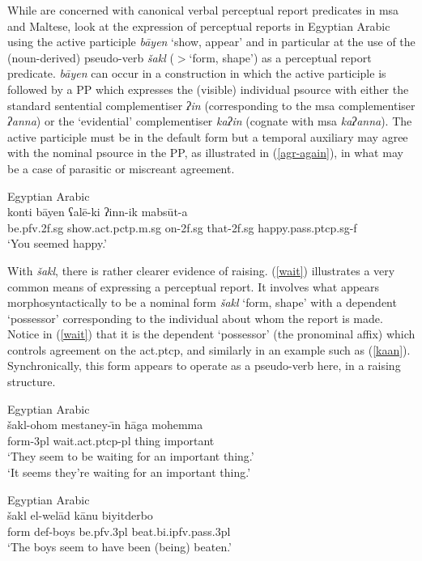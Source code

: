 \documentclass[output=paper,hidelinks]{langscibook}
\begin{document}
While \citet{CES:LFG14} are  concerned with canonical verbal perceptual report predicates in {\sc msa} and Maltese,   \citet{ES:LFG15} look at the  expression of perceptual reports in Egyptian Arabic  using the active participle {\em b\={a}yen} `show, appear' and in particular at the use of the  (noun-derived) pseudo-verb {\em šakl} ($>$`form, shape') as a perceptual report predicate.  {\em b\={a}yen} can occur in a construction in which the  active participle  is followed by a PP which expresses the (visible) individual {\sc psource}
 with either the standard sentential complementiser {\em {ʔ}in} (corresponding to the {\sc msa} complementiser {\em {ʔ}anna})
or the `evidential' complementiser {\em ka{ʔ}in} (cognate with {\sc msa} {\em ka{ʔ}anna}).  The active participle must be in the default form but a temporal auxiliary may agree with the nominal {\sc psource} in the PP, as illustrated in (\ref{agr-again}), in what may be a case of parasitic or miscreant agreement.

\ea  \label{agr-again}  Egyptian Arabic \citep[92]{ES:LFG15}\\
\gll konti b\={a}yen ʕal\={e}-ki ʔinn-ik mabs\={u}t-a\\
be.{\sc pfv.2f.sg} show.{\sc act.pctp.m.sg} on-{\sc 2f.sg} that-{\sc 2f.sg} happy.{\sc pass.ptcp.sg-f}\\
\glt `You seemed happy.'
\z


With {\em šakl}, there is rather clearer evidence of raising.
(\ref{wait}) illustrates a very common means of expressing a perceptual report.  It involves what appears morphosyntactically to be a  nominal form {\em šakl} `form, shape' with a dependent `possessor' corresponding to the individual about whom the report is made. Notice in (\ref{wait}) that it is the dependent `possessor' (the pronominal affix) which controls agreement on the {\sc act.ptcp}, and similarly in an example such as  (\ref{kaan}). Synchronically, this form appears to operate as a pseudo-verb here, in a raising structure.



\ea \label{wait} Egyptian Arabic \citep[95]{ES:LFG15}\\
\gll šakl-ohom mestaney-\={\i}n ħ\={a}ga mohemma\\
form-{\sc 3pl} wait.{\sc act.ptcp-pl} thing important\\
\glt `They seem to be waiting for an important thing.' \\
`It seems they're waiting for an important thing.'
\z


\ea \label{kaan} Egyptian Arabic \citep[98]{ES:LFG15}\\
\gll šakl el-wel\={a}d k\={a}nu biyitderbo\\
form {\sc def}-boys be.{\sc pfv.3pl} beat.{\sc bi.ipfv.pass.3pl}\\
\glt `The boys seem to have been (being) beaten.'
\z
\end{document}
